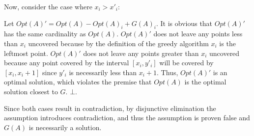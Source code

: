 \documentclass[12pt]{article}
\begin{document}
Now, consider the case where $x_{i} > x'_{i}$:

Let $Opt(A)' = Opt(A) - Opt(A)_{i} + G(A)_{i}$. It is obvious that $Opt(A)'$ has the same cardinality as $Opt(A)$. $Opt(A)'$ does not leave any points less than $x_{i}$ uncovered because by the definition of the greedy algorithm $x_{i}$ is the leftmost point. $Opt(A)'$ does not leave any points greater than $x_{i}$ uncovered because any point covered by the interval $[x_{i}, y'_{i}]$ will be covered by $[x_{i}, x_{i} + 1]$ since $y'_{i}$ is necessarily less than $x_{i} + 1$. Thus, $Opt(A)'$ is an optimal solution, which violates the premise that $Opt(A)$ is the optimal solution closest to $G$. $\bot$.

Since both cases result in contradiction, by disjunctive elimination the assumption introduces contradiction, and thus the assumption is proven false and $G(A)$ is necessarily a solution.
\end{document}
